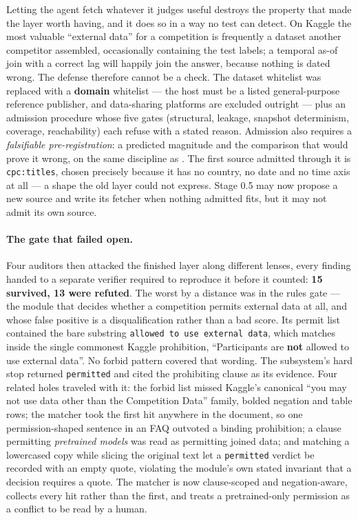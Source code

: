 \documentclass[11pt,a4paper]{article}
\begin{document}
Letting the agent fetch whatever it judges useful destroys the property that made the layer
worth having, and it does so in a way no test can detect. On Kaggle the most valuable
``external data'' for a competition is frequently a dataset another competitor assembled,
occasionally containing the test labels; a temporal as-of join with a correct lag will happily
join the answer, because nothing is dated wrong. The defense therefore cannot be a check. The
dataset whitelist was replaced with a \textbf{domain} whitelist --- the host must be a listed
general-purpose reference publisher, and data-sharing platforms are excluded outright --- plus
an admission procedure whose five gates (structural, leakage, snapshot determinism, coverage,
reachability) each refuse with a stated reason. Admission also requires a \emph{falsifiable
pre-registration}: a predicted magnitude and the comparison that would prove it wrong, on the
same discipline as . The first source admitted through it is
\texttt{cpc:titles}, chosen precisely because it has no country, no date and no time axis at
all --- a shape the old layer could not express. Stage 0.5 may now propose a new source and
write its fetcher when nothing admitted fits, but it may not admit its own source.

\paragraph{The gate that failed open.} Four auditors then attacked the finished layer along
different lenses, every finding handed to a separate verifier required to reproduce it before
it counted: \textbf{15 survived, 13 were refuted}. The worst by a distance was in the rules
gate --- the module that decides whether a competition permits external data at all, and whose
false positive is a disqualification rather than a bad score. Its permit list contained the
bare substring \texttt{allowed to use external data}, which matches inside the single commonest
Kaggle prohibition, ``Participants are \textbf{not} allowed to use external data''. No forbid
pattern covered that wording. The subsystem's hard stop returned \texttt{permitted} and cited
the prohibiting clause as its evidence. Four related holes traveled with it: the forbid list
missed Kaggle's canonical ``you may not use data other than the Competition Data'' family,
bolded negation and table rows; the matcher took the first hit anywhere in the document, so one
permission-shaped sentence in an FAQ outvoted a binding prohibition; a clause permitting
\emph{pretrained models} was read as permitting joined data; and matching a lowercased copy
while slicing the original text let a \texttt{permitted} verdict be recorded with an empty
quote, violating the module's own stated invariant that a decision requires a quote. The
matcher is now clause-scoped and negation-aware, collects every hit rather than the first, and
treats a pretrained-only permission as a conflict to be read by a human.
\end{document}
